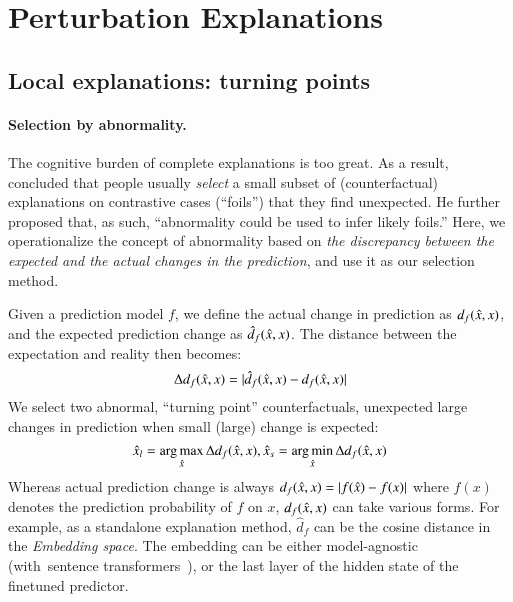 
\newcommand{\fwone}[1]{\colbox{cfwone}{#1}\xspace}
\newcommand{\fwtwo}[1]{\colbox{cfwtwo}{#1}\xspace}
\newcommand{\fwthree}[1]{\colbox{cfwthree}{#1}\xspace}
\newcommand{\fwfour}[1]{\colbox{cfwfour}{#1}\xspace}

\newcommand{\fexp}[2]{\texttt{[{\color{darkgray}{#1:#2}}]}\xspace}
\newcommand{\fexptag}[1]{\fexp{TAG}{#1}}
\newcommand{\fexpfrom}[1]{\fexp{FROM}{#1}}
\newcommand{\fexpto}[1]{\fexp{TO}{#1}}
\newcommand{\fexptemp}[1]{\fexp{TEMP}{#1}}


\section{Perturbation Explanations}


\subsection{Local explanations: turning points}

\paragraph{Selection by abnormality.}
The cognitive burden of complete explanations is too great.
As a result, \citet{miller} concluded that people usually \emph{select} a small subset of (counterfactual) explanations on contrastive cases (``foils'') that they find unexpected. 
He further proposed that, as such, ``abnormality could be used to infer likely foils.''
Here, we operationalize the concept of abnormality based on \emph{the discrepancy between the expected and the actual changes in the prediction}, and use it as our selection method.

Given a prediction model $f$, we define the actual change in prediction as $d_f(\hat{x}, x)$, and the expected prediction change as $\hat{d}_f(\hat{x}, x)$.
The distance between the expectation and reality then becomes:
$$\Delta d_f(\hat{x}, x) = |\hat{d}_f(\hat{x}, x)-d_f(\hat{x}, x)|$$
We select two abnormal, ``turning point'' counterfactuals, \ie unexpected large changes in prediction when small (large) change is expected:
$$ \hat{x}_l = \operatorname*{arg\,max}_{\hat{x}} \Delta d_f(\hat{x}, x), \hat{x}_s = \operatorname*{arg\,min}_{\hat{x}} \Delta d_f(\hat{x}, x)$$
Whereas actual prediction change is always $d_f(\hat{x}, x)=|f(\hat{x})-f(x)|$ where $f(x)$ denotes the prediction probability of $f$ on $x$, $d_f(\hat{x}, x)$ can take various forms. 
For example, as a standalone explanation method, $\hat{d}_f$ can be the cosine distance in the \emph{Embedding space}.
The embedding can be either model-agnostic (\eg with~sentence transformers~\cite{reimers-2019-sentence-bert}), or the last layer of the hidden state of the finetuned predictor.

